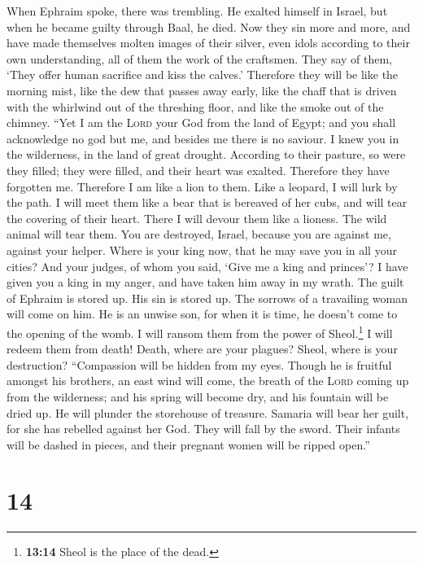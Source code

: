  When Ephraim spoke, there was trembling. He exalted
himself in Israel, but when he became guilty through Baal, he died.
 Now they sin more and more, and have made themselves
molten images of their silver, even idols according to their own
understanding, all of them the work of the craftsmen. They say of them,
`They offer human sacrifice and kiss the calves.' 
Therefore they will be like the morning mist, like the dew that passes
away early, like the chaff that is driven with the whirlwind out of the
threshing floor, and like the smoke out of the chimney. 
``Yet I am the \textsc{Lord} your God from the land of Egypt; and you
shall acknowledge no god but me, and besides me there is no saviour.
 I knew you in the wilderness, in the land of great
drought.  According to their pasture, so were they filled;
they were filled, and their heart was exalted. Therefore they have
forgotten me.  Therefore I am like a lion to them. Like a
leopard, I will lurk by the path.  I will meet them like a
bear that is bereaved of her cubs, and will tear the covering of their
heart. There I will devour them like a lioness. The wild animal will
tear them.  You are destroyed, Israel, because you are
against me, against your helper.  Where is your king now,
that he may save you in all your cities? And your judges, of whom you
said, `Give me a king and princes'?  I have given you a
king in my anger, and have taken him away in my wrath. 
The guilt of Ephraim is stored up. His sin is stored up. 
The sorrows of a travailing woman will come on him. He is an unwise son,
for when it is time, he doesn't come to the opening of the womb.
 I will ransom them from the power of Sheol.\footnote{\textbf{13:14}
  Sheol is the place of the dead.} I will redeem them from death! Death,
where are your plagues? Sheol, where is your destruction? ``Compassion
will be hidden from my eyes.  Though he is fruitful
amongst his brothers, an east wind will come, the breath of the
\textsc{Lord} coming up from the wilderness; and his spring will become
dry, and his fountain will be dried up. He will plunder the storehouse
of treasure.  Samaria will bear her guilt, for she has
rebelled against her God. They will fall by the sword. Their infants
will be dashed in pieces, and their pregnant women will be ripped
open.''

\hypertarget{section-13}{%
\section{14}\label{section-13}}

